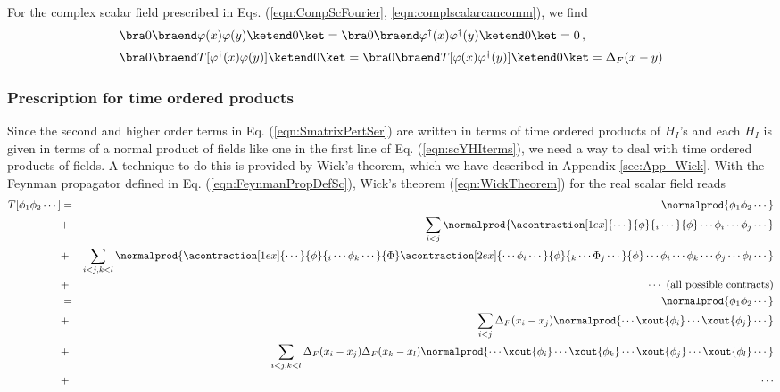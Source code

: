 For the complex scalar field prescribed in Eqs. (\ref{eqn:CompScFourier}, \ref{eqn:complscalarcancomm}),
we find 
\begin{eqnarray}
\begin{array}{l}
\bra 0 \braend \varphi(x) \varphi(y) \ketend 0 \ket = 
\bra 0 \braend \varphi^\dagger(x) \varphi^\dagger(y) \ketend 0 \ket = 0\,,
\vspace{2mm}
\\
\bra 0 \braend T[\varphi^\dagger(x) \varphi(y)] \ketend 0 \ket 
= 
\bra 0 \braend T[\varphi(x) \varphi^\dagger(y)] \ketend 0 \ket 
= 
\Delta_F(x-y)
\end{array}
\label{eqn:CplxScProp}
\end{eqnarray}

\subsubsection{Prescription for time ordered products}
Since the second and higher order terms in Eq. (\ref{eqn:SmatrixPertSer})
are written in terms of time ordered products of $H_I$'s and
each $H_I$ is given in terms of a normal product of fields like
one in the first line of Eq. (\ref{eqn:scYHIterms}), 
we need a way to deal with time ordered products 
of fields. A technique to do this is provided by Wick's theorem, 
which we have described in Appendix \ref{sec:App_Wick}.
With the Feynman propagator defined in Eq. (\ref{eqn:FeynmanPropDefSc}),
Wick's theorem (\ref{eqn:WickTheorem}) for the real scalar field reads
\begin{eqnarray}
T[\phi_1 \phi_2 \cdots ]
&=&
\normalprod{\phi_1 \phi_2 \cdots }
\nonumber\\
&+&
\sum_{i < j}  
\normalprod{
\acontraction[1ex]{\cdots}{\phi}{{}_i\cdots}{\phi}
\cdots \phi_i \cdots \phi_j \cdots
}%
\nonumber\\
&+&
\sum_{i < j, k<l}  
\normalprod{
\acontraction[1ex]{\cdots}{\phi}{{}_i\cdots \phi_k \cdots}{\Phi}
\acontraction[2ex]{\cdots \phi_i \cdots }{\phi}{{}_k\cdots \Phi_j \cdots}{\phi}
\cdots \phi_i \cdots \phi_k \cdots  \phi_j \cdots \phi_l \cdots
}%
\nonumber\\
&+&
\cdots  \mbox{ (all possible contracts)}
\nonumber\\
&=&
\normalprod{\phi_1 \phi_2 \cdots }
\nonumber\\
&+&
\sum_{i < j}  
\Delta_F(x_i - x_j)
\normalprod{
\cdots \xout{\phi_i} \cdots \xout{\phi_j} \cdots
}%
\nonumber\\
&+&
\sum_{i < j, k<l}  
\Delta_F(x_i - x_j)
\Delta_F(x_k - x_l)
\normalprod{
\cdots \xout{\phi_i} \cdots \xout{\phi_k} \cdots  \xout{\phi_j} \cdots \xout{\phi_l} \cdots
}%
\nonumber\\
&+&
\cdots
\nonumber\\
\label{eqn:WickTheoremRealSc}
\end{eqnarray}
